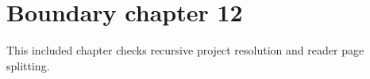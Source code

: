 \section{Boundary chapter 12}
\label{sec:boundary-12}
This included chapter checks recursive project resolution and reader page splitting.
